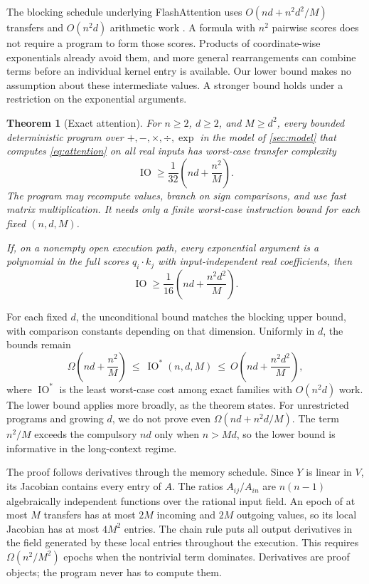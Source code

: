 \documentclass[11pt]{article}
\newtheorem{theorem}{Theorem}[section]
\theoremstyle{definition}
\theoremstyle{remark}
\newcommand{\IO}{\operatorname{IO}}
\begin{document}
The blocking schedule underlying FlashAttention uses
$O(nd+n^2d^2/M)$ transfers and $O(n^2d)$ arithmetic work
\cite{dao2022}. A formula with $n^2$ pairwise scores does not require
a program to form those scores. Products of coordinate-wise
exponentials already avoid them, and more general rearrangements
can combine terms before an individual kernel entry is available.
Our lower bound makes no assumption about these intermediate values.
A stronger bound holds under a restriction on the exponential arguments.

\begin{theorem}[Exact attention]
\label{thm:attention}
For $n\ge2$, $d\ge2$, and $M\ge d^2$, every bounded deterministic
program over $+,-,\times,\div,\exp$ in the model of
\cref{sec:model} that computes \cref{eq:attention} on all real inputs
has worst-case transfer complexity
\begin{equation}
 \IO\ge\frac1{32}\left(nd+\frac{n^2}{M}\right).
 \label{eq:main-lower}
\end{equation}
The program may recompute values, branch on sign comparisons, and use
fast matrix multiplication. It needs only a finite worst-case
instruction bound for each fixed $(n,d,M)$.

If, on a nonempty open execution path, every exponential argument is
a polynomial in the full scores $q_i\cdot k_j$ with input-independent
real coefficients, then
\[
 \IO\ge\frac1{16}\left(nd+\frac{n^2d^2}{M}\right).
\]
\end{theorem}

For each fixed $d$, the unconditional bound matches the blocking upper bound, with
comparison constants depending on that dimension. Uniformly in $d$,
the bounds remain
\begin{equation}
 \Omega\!\left(nd+\frac{n^2}{M}\right)
 \ \le\ \IO^*(n,d,M)\ \le\
 O\!\left(nd+\frac{n^2d^2}{M}\right),
 \label{eq:bracket}
\end{equation}
where $\IO^*$ is the least worst-case cost among exact families with
$O(n^2d)$ work. The lower bound applies more broadly, as the theorem
states. For unrestricted programs and growing $d$, we do not prove even
$\Omega(nd+n^2d/M)$. The term $n^2/M$ exceeds the
compulsory $nd$ only when $n>Md$, so the lower bound is informative in
the long-context regime.

The proof follows derivatives through the memory schedule. Since
$Y$ is linear in $V$, its Jacobian contains every entry of $A$.
The ratios $A_{ij}/A_{in}$ are $n(n-1)$ algebraically independent
functions over the rational input field. An epoch of at most $M$
transfers has at most $2M$ incoming and $2M$ outgoing values, so its
local Jacobian has at most $4M^2$ entries. The chain rule puts all
output derivatives in the field generated by these local entries
throughout the execution. This requires $\Omega(n^2/M^2)$ epochs
when the nontrivial term dominates. Derivatives are proof objects;
the program never has to compute them.
\end{document}
